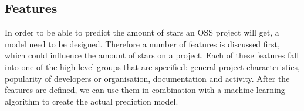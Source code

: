         
        
    
    
    \subsection{Features}
    In order to be able to predict the amount of stars an OSS project will get, a model need to be designed.
    Therefore a number of features is discussed first, which could influence the amount of stars on a project.
    Each of these features fall into one of the high-level groups that are specified: general project characteristics, popularity of developers or organisation, documentation and activity.
    After the features are defined, we can use them in combination with a machine learning algorithm to create the actual prediction model.

